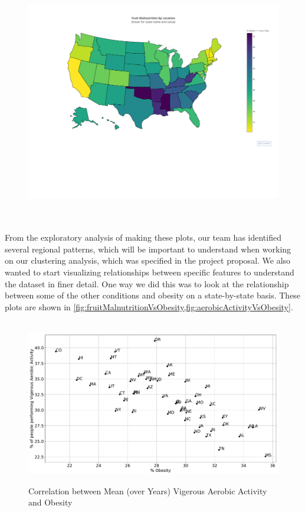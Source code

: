 \documentclass{article}
\begin{document}
\begin{figure}[h]
\centering
\caption{}
\includegraphics[width=\linewidth]{images/exploration_d3_map_fruit_mal_adults.pdf}
\label{fig:fruitMalnutritionByLocation}
\end{figure}
\\\\
From the exploratory analysis of making these plots, our team has identified several regional patterns, which will be important to understand when working on our clustering analysis, which was specified in the project proposal.
We also wanted to start visualizing relationships between specific features to understand the dataset in finer detail. One way we did this was to look at the relationship between some of the other conditions and obesity on a state-by-state basis. These plots are shown in \cref{fig:fruitMalnutritionVsObesity,fig:aerobicActivityVsObesity}. 
\\\\
\begin{figure}[h]
\centering
\caption{Correlation between Mean (over Years) Vigerous Aerobic Activity and Obesity}
\includegraphics[width=\linewidth]{images/exploration_vigerous_aerobic_vs_obesity.pdf}
\label{fig:aerobicActivityVsObesity}
\end{figure}
\end{document}
